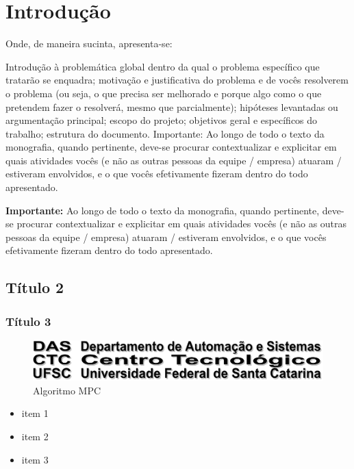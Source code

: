 \chapter{Introdução}
Onde, de maneira sucinta, apresenta-se:

Introdução à problemática global dentro da qual o problema específico que tratarão se enquadra; motivação e justificativa do problema e de vocês resolverem o problema (ou seja, o que precisa ser melhorado e porque algo como o que pretendem fazer o resolverá, mesmo que parcialmente); hipóteses levantadas ou argumentação principal; escopo do projeto; objetivos geral e específicos do trabalho; estrutura do documento.
Importante: Ao longo de todo o texto da monografia, quando pertinente, deve-se procurar contextualizar e explicitar em quais atividades vocês (e não as outras pessoas da equipe / empresa) atuaram / estiveram envolvidos, e o que vocês efetivamente fizeram dentro do todo apresentado.


\textbf{Importante:} Ao longo de todo o texto da monografia, quando pertinente, deve-se procurar contextualizar e explicitar em quais atividades vocês (e não as outras pessoas da equipe / empresa) atuaram / estiveram envolvidos, e o que vocês efetivamente fizeram dentro do todo apresentado.

\section{Título 2}

\subsection{Título 3}

\begin{figure}
	   \centering
	   		\includegraphics[scale=0.35]{figuras/logo-das} 
	   \caption{Algoritmo MPC}
	   \label{label para referencia cruzada Figura}
\end{figure}



\begin{itemize}
	\item item 1
	\item item 2
	\item item 3
\end{itemize}

